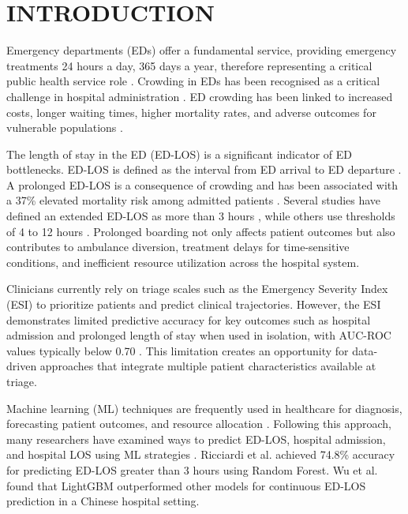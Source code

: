 \documentclass[harvard,article]{frontiersinFPHY_FAMS}
\begin{document}
\section{INTRODUCTION}

Emergency departments (EDs) offer a fundamental service, providing emergency treatments 24 hours a day, 365 days a year, therefore representing a critical public health service role \cite{higginson2012, trzeciak2003, ricciardi2024}. Crowding in EDs has been recognised as a critical challenge in hospital administration \cite{asplin2003, rcem2025}. ED crowding has been linked to increased costs, longer waiting times, higher mortality rates, and adverse outcomes for vulnerable populations \cite{sun2013, burke2020, obermeyer2019}.

The length of stay in the ED (ED-LOS) is a significant indicator of ED bottlenecks. ED-LOS is defined as the interval from ED arrival to ED departure \cite{stone2022, ricciardi2024}. A prolonged ED-LOS is a consequence of crowding and has been associated with a 37\% elevated mortality risk among admitted patients \cite{sun2013}. Several studies have defined an extended ED-LOS as more than 3 hours \cite{ricciardi2024}, while others use thresholds of 4 to 12 hours \cite{farimani2024}. Prolonged boarding not only affects patient outcomes but also contributes to ambulance diversion, treatment delays for time-sensitive conditions, and inefficient resource utilization across the hospital system.

Clinicians currently rely on triage scales such as the Emergency Severity Index (ESI) to prioritize patients and predict clinical trajectories. However, the ESI demonstrates limited predictive accuracy for key outcomes such as hospital admission and prolonged length of stay when used in isolation, with AUC-ROC values typically below 0.70 \cite{levin2020}. This limitation creates an opportunity for data-driven approaches that integrate multiple patient characteristics available at triage.

Machine learning (ML) techniques are frequently used in healthcare for diagnosis, forecasting patient outcomes, and resource allocation \cite{kareemi2020, raita2019}. Following this approach, many researchers have examined ways to predict ED-LOS, hospital admission, and hospital LOS using ML strategies \cite{wu2025, fenn2021, lin2024}. Ricciardi et al. \cite{ricciardi2024} achieved 74.8\% accuracy for predicting ED-LOS greater than 3 hours using Random Forest. Wu et al. \cite{wu2025} found that LightGBM outperformed other models for continuous ED-LOS prediction in a Chinese hospital setting.
\end{document}
